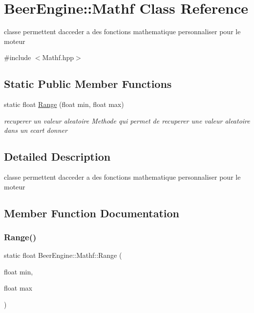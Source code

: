 \hypertarget{class_beer_engine_1_1_mathf}{}\section{Beer\+Engine\+:\+:Mathf Class Reference}
\label{class_beer_engine_1_1_mathf}


classe permettent d\textquotesingle{}acceder a des fonctions mathematique personnaliser pour le moteur  




{\ttfamily \#include $<$Mathf.\+hpp$>$}

\subsection*{Static Public Member Functions}
\begin{DoxyCompactItemize}
\item 
static float \mbox{\hyperlink{class_beer_engine_1_1_mathf_a857806a2b256303e5a737c6143e35454}{Range}} (float min, float max)
\begin{DoxyCompactList}\small\item\em recuperer un valeur aleatoire Methode qui permet de recuperer une valeur aleatoire dans un ecart donner \end{DoxyCompactList}\end{DoxyCompactItemize}


\subsection{Detailed Description}
classe permettent d\textquotesingle{}acceder a des fonctions mathematique personnaliser pour le moteur 

\subsection{Member Function Documentation}
\mbox{\label{class_beer_engine_1_1_mathf_a857806a2b256303e5a737c6143e35454}} 
\subsubsection{\texorpdfstring{Range()}{Range()}}
{\footnotesize\ttfamily static float Beer\+Engine\+::\+Mathf\+::\+Range (\begin{DoxyParamCaption}\item[{float}]{min,  }\item[{float}]{max }\end{DoxyParamCaption})\hspace{0.3cm}{\ttfamily [static]}}



